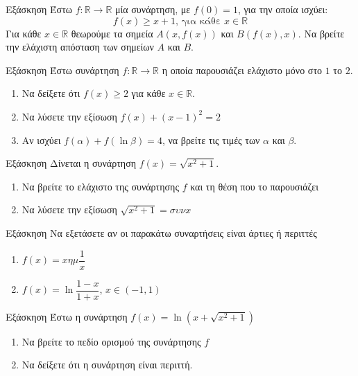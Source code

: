 \documentclass[greek]{beamer}
\begin{document}
\begin{frame}{Εξάσκηση}
      Έστω $f:\mathbb{R}\to\mathbb{R}$ μία συνάρτηση, με $f(0)=1$, για την οποία ισχύει:
      $$f(x)\ge x+1 \text{, για κάθε } x\in\mathbb{R}$$
      Για κάθε $x\in\mathbb{R}$ θεωρούμε τα σημεία $Α(x,f(x))$ και $Β(f(x),x)$. Να βρείτε την ελάχιστη απόσταση των σημείων $Α$ και $Β$.
\end{frame}

\begin{frame}{Εξάσκηση}
      Έστω συνάρτηση $f:\mathbb{R}\to \mathbb{R}$ η οποία παρουσιάζει ελάχιστο μόνο στο $1$ το $2$.
      \begin{enumerate}
            \item Να δείξετε ότι $f(x)\ge 2$ για κάθε $x\in\mathbb{R}$. \pause
            \item Να λύσετε την εξίσωση $f(x)+(x-1)^2=2$ \pause
            \item Αν ισχύει $f(α)+f(\ln β)=4$, να βρείτε τις τιμές των $α$ και $β$.
      \end{enumerate}
\end{frame}

\begin{frame}{Εξάσκηση}
      Δίνεται η συνάρτηση $f(x)=\sqrt{x^2+1}$.
      \begin{enumerate}
            \item Να βρείτε το ελάχιστο της συνάρτησης $f$ και τη θέση που το παρουσιάζει \pause
            \item Να λύσετε την εξίσωση $\sqrt{x^2+1}=συνx$
      \end{enumerate}
\end{frame}

\begin{frame}{Εξάσκηση}
      Να εξετάσετε αν οι παρακάτω συναρτήσεις είναι άρτιες ή περιττές
      \begin{enumerate}
            \item $f(x)=xημ\dfrac{1}{x}$ \pause
            \item $f(x)=\ln \dfrac{1-x}{1+x}$, $x\in (-1,1)$
      \end{enumerate}
\end{frame}

\begin{frame}{Εξάσκηση}
      Έστω η συνάρτηση $f(x)=\ln (x+\sqrt{x^2+1})$
      \begin{enumerate}
            \item Να βρείτε το πεδίο ορισμού της συνάρτησης $f$ \pause
            \item Να δείξετε ότι η συνάρτηση είναι περιττή.
      \end{enumerate}
\end{frame}
\end{document}
